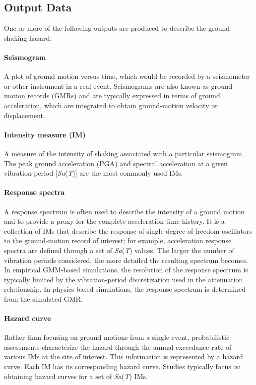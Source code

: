\subsection{Output Data}

\noindent One or more of the following outputs are produced to describe the ground-shaking hazard:

\paragraph{Seismogram} A plot of ground motion versus time, which would be recorded by a seismometer or other instrument in a real event. Seismograms are also known as ground-motion records (GMRs) and are typically expressed in terms of ground acceleration, which are integrated to obtain ground-motion velocity or displacement.  

\paragraph{Intensity measure (IM)} A measure of the intensity of shaking associated with a particular seismogram. The peak ground acceleration (PGA) and spectral acceleration at a given vibration period [\textit{Sa}(\textit{T})] are the most commonly used IMs.

\paragraph{Response spectra} A response spectrum is often used to describe the intensity of a ground motion and to provide a proxy for the complete acceleration time history. It is a collection of IMs that describe the response of single-degree-of-freedom oscillators to the ground-motion record of interest; for example, acceleration response spectra are defined through a set of \textit{Sa}(\textit{T}) values. The larger the number of vibration periods considered, the more detailed the resulting spectrum becomes. In empirical GMM-based simulations, the resolution of the response spectrum is typically limited by the vibration-period discretization used in the attenuation relationship. In physics-based simulations, the response spectrum is determined from the simulated GMR.

\paragraph{Hazard curve} Rather than focusing on ground motions from a single event, probabilistic assessments characterize the hazard through the annual exceedance rate of various IMs at the site of interest. This information is represented by a hazard curve. Each IM has its corresponding hazard curve. Studies typically focus on obtaining hazard curves for a set of \textit{Sa}(\textit{T}) IMs. 

